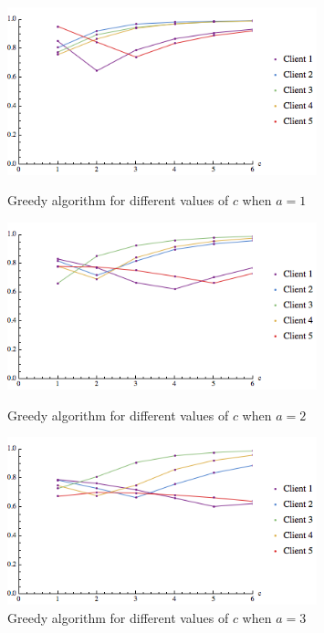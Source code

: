 \begin{figure}[t]
\centering
\begin{minipage}[h]{0.48\textwidth}
\centering
\includegraphics[width=0.8\textwidth]{images/real_greedy_a=1.png}
\caption{Greedy algorithm for different values of $c$ when $a=1$}\label{fig:real_greedy_a=1}
\end{minipage}
\hspace{0cm}
\begin{minipage}[h]{0.48\textwidth}
\centering
\includegraphics[width=0.8\textwidth]{images/real_greedy_a=2.png}
\caption{Greedy algorithm for different values of $c$ when $a=2$}\label{fig:real_sampling_a=2}
\end{minipage}
\hspace{0cm}
\begin{minipage}[h]{0.48\textwidth}
\centering
\includegraphics[width=0.8\textwidth]{images/real_greedy_a=3.png}
\caption{Greedy algorithm for different values of $c$ when $a=3$}\label{fig:real_greedy_a=3}
\end{minipage}
\vspace{-0.2in}
\end{figure}

